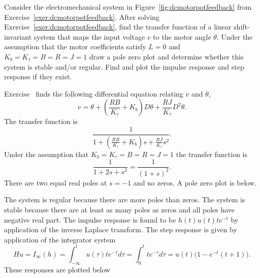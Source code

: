 \begin{excersizelist}
\begin{hardexercise}
\begin{solution}
\end{solution}
\end{hardexercise}

\item \label{exer:dcmotorpotfeedbacktranfunc} Consider the electromechanical system in Figure~\ref{fig:dcmotorpotfeedback} from Exercise~\ref{exer:dcmotorpotfeedback}.  After solving Exercise~\ref{exer:dcmotorpotfeedback}, find the transfer function of a linear shift-invariant system that maps the input voltage $v$ to the motor angle $\theta$.  Under the assumption that the motor coefficients satisfy $L=0$ and $K_b=K_\tau=B=R=J=1$ draw a pole zero plot and determine whether this system is stable and/or regular.  Find and plot the impulse response and step response if they exist.

\begin{solution}
Exercise~ finds the following differential equation relating $v$ and $\theta$,
\[
v = \theta + \left(\frac{RB}{K_\tau} + K_b\right) D \theta + \frac{RJ}{K_\tau} D^2 \theta.
\]
The transfer function is
\[
\frac{1}{1 + \left(\frac{RB}{K_\tau} + K_b\right) s  + \frac{RJ}{K_\tau} s^2}.
\]
Under the assumption that $K_b=K_\tau=B=R=J=1$ the transfer function is
\[
\frac{1}{1 + 2s  + s^2} = \frac{1}{(1 + s)^2}.
\]
There are two equal real poles at $s = -1$ and no zeros.  A pole zero plot is below.

\begin{center}
\end{center}

The system is regular because there are more poles than zeros.  The system is stable because there are at least as many poles as zeros and all poles have negative real part.  The impulse response is found to be $h(t) u(t) t e^{-t}$ by application of the inverse Laplace transform.  The step response is given by application of the integrator system
\[ 
Hu = I_\infty(h) = \int_{-\infty}^t u(\tau) t e^{-\tau} d\tau = \int_{0}^t t e^{-\tau} d\tau = u(t) \big( 1 - e^{-t}(t+1) \big).
\] 
These responses are plotted below

\begin{center}


\end{center}
\end{solution}
\end{excersizelist}
